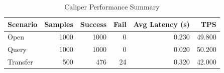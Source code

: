 \begin{table}
\caption{Caliper Performance Summary}
\label{tab:caliper_round}
\begin{tabular}{lrrrrr}
\toprule
Scenario & Samples & Success & Fail & Avg Latency (s) & TPS \\
\midrule
Open & 1000 & 1000 & 0 & 0.230 & 49.800 \\
Query & 1000 & 1000 & 0 & 0.020 & 50.200 \\
Transfer & 500 & 476 & 24 & 0.320 & 42.000 \\
\bottomrule
\end{tabular}
\end{table}
